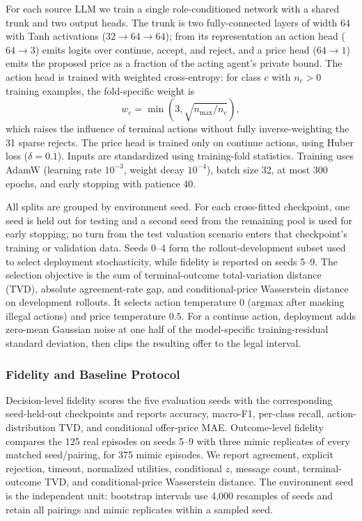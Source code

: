 For each source LLM we train a single role-conditioned network with a shared trunk and two output heads. The trunk is two fully-connected layers of width $64$ with Tanh activations ($32\!\to\!64\!\to\!64$); from its representation an action head ($64\!\to\!3$) emits logits over continue, accept, and reject, and a price head ($64\!\to\!1$) emits the proposed price as a fraction of the acting agent's private bound. The action head is trained with weighted cross-entropy: for class $c$ with $n_c>0$ training examples, the fold-specific weight is
\begin{equation}
w_c=\min\!\left(3,\sqrt{n_{\max}/n_c}\right),
\end{equation}
which raises the influence of terminal actions without fully inverse-weighting the 31 sparse rejects. The price head is trained only on continue actions, using Huber loss ($\delta=0.1$). Inputs are standardized using training-fold statistics. Training uses AdamW (learning rate $10^{-3}$, weight decay $10^{-4}$), batch size 32, at most 300 epochs, and early stopping with patience 40.

All splits are grouped by environment seed. For each cross-fitted checkpoint, one seed is held out for testing and a second seed from the remaining pool is used for early stopping; no turn from the test valuation scenario enters that checkpoint's training or validation data. Seeds 0--4 form the rollout-development subset used to select deployment stochasticity, while fidelity is reported on seeds 5--9. The selection objective is the sum of terminal-outcome total-variation distance (TVD), absolute agreement-rate gap, and conditional-price Wasserstein distance on development rollouts. It selects action temperature $0$ (argmax after masking illegal actions) and price temperature $0.5$. For a continue action, deployment adds zero-mean Gaussian noise at one half of the model-specific training-residual standard deviation, then clips the resulting offer to the legal interval.

\subsubsection{Fidelity and Baseline Protocol}

Decision-level fidelity scores the five evaluation seeds with the corresponding seed-held-out checkpoints and reports accuracy, macro-F1, per-class recall, action-distribution TVD, and conditional offer-price MAE. Outcome-level fidelity compares the 125 real episodes on seeds 5--9 with three mimic replicates of every matched seed/pairing, for 375 mimic episodes. We report agreement, explicit rejection, timeout, normalized utilities, conditional $z$, message count, terminal-outcome TVD, and conditional-price Wasserstein distance. The environment seed is the independent unit: bootstrap intervals use 4{,}000 resamples of seeds and retain all pairings and mimic replicates within a sampled seed.

